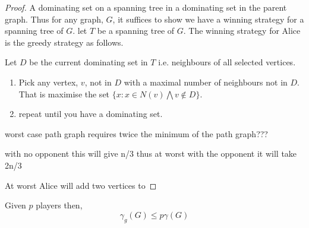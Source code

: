 \begin{proof}
    A dominating set on a spanning tree in a dominating set in the parent graph.
    Thus for any graph, $G$, it suffices to show we have a winning strategy for a spanning tree of $G$. 
    let $T$ be a spanning tree of $G$.
    The winning strategy for Alice is the greedy strategy as follows. 
    
    Let $D$ be the current dominating set in $T$ i.e. neighbours of all selected vertices.
    \begin{enumerate}
        \item Pick any vertex, $v$, not in $D$ with a maximal number of neighbours not in $D$. That is maximise the set $\{x: x \in N(v) \bigwedge v \notin D\}$.
        \item repeat until you have a dominating set.
    \end{enumerate}

       worst case path graph requires twice the minimum of the path graph???
       
       with no opponent this will give n/3 thus at worst with the opponent it will take 2n/3 
       
    At worst Alice will add two vertices to 
\end{proof}

\begin{theorem}
    Given $p$ players then,
    \[\gamma_g(G) \leq p\gamma(G) \]
\end{theorem}













